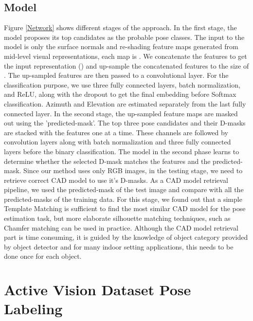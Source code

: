 \documentclass[letterpaper, 10 pt, conference]{ieeeconf}  \pdfoutput=1
\begin{document}
\subsection{Model}
\label{Model}
Figure \ref{Network} shows different stages of the approach. In the first stage, the model proposes its top candidates as the probable pose classes. The input to the model is only the surface normals and re-shading feature maps generated from mid-level visual representations, each map is . We concatenate the features to get the input representation () and up-sample the concatenated features to the size of . The up-sampled features are then passed to a convolutional layer. For the classification purpose, we use three fully connected layers, batch normalization, and ReLU, along with the dropout to get the final embedding before Softmax classification. Azimuth and Elevation are estimated separately from the last fully connected layer.
In the second stage, the up-sampled feature maps are masked out using the 'predicted-mask'. The top three pose candidates and their D-masks are stacked with the features one at a time.
These channels are followed by convolution layers along with batch normalization and three fully connected layers before the binary classification. The model in the second phase learns to determine whether the selected D-mask matches the features and the predicted-mask. Since our method uses only RGB images, in the testing stage, we need to retrieve correct CAD model to use it's D-masks. As a CAD model retrieval pipeline, we used the predicted-mask of the test image and compare with all the predicted-masks of the training data. For this stage, we found out that a simple Template Matching is sufficient to find the most similar CAD model for the pose estimation task, but more elaborate silhouette matching techniques, such as Chamfer matching can be used in practice. Although the CAD model retrieval part is time consuming, it is guided by the knowledge of object category provided by object detector and for many indoor setting applications, this needs to be done once for each object.













\section{Active Vision Dataset Pose Labeling}
\end{document}
